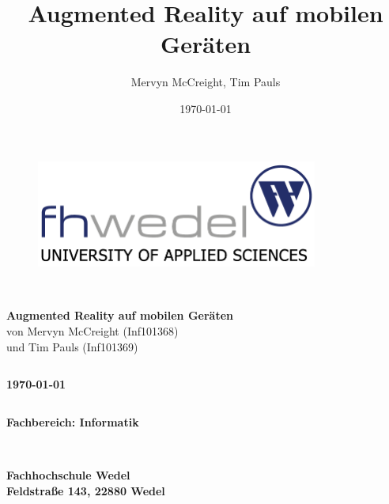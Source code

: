 \documentclass[a4paper, 12pt, hidelinks]{report}
\title{Augmented Reality auf mobilen Geräten}
\author{Mervyn McCreight, Tim Pauls}
\date{\today}
\begin{document}


\begin{figure}[h]
\centering
\includegraphics[width=350px]{graphics/fhwedel}
\label{fig:fhwedel}
\end{figure}




\begin{verbatim}


\end{verbatim}

\begin{center}
\textbf{\LARGE{Augmented Reality auf mobilen Geräten}}\\
von Mervyn McCreight (Inf101368)\\
und Tim Pauls (Inf101369)

\end{center}

\begin{verbatim}
\end{verbatim}

\begin{center}
\textbf{\today}
\end{center}

\begin{verbatim}
\end{verbatim}

\begin{center}
\textbf{\large{Fachbereich: Informatik}}
\end{center}

\begin{verbatim}


\end{verbatim}

\begin{center}
\textbf{\large{Fachhochschule Wedel}} \\
\textbf{\large{Feldstraße 143, 22880 Wedel}} \\
\end{center}
\end{document}

